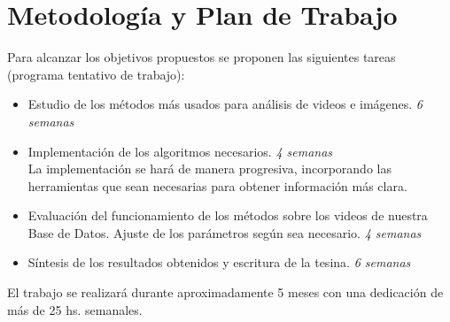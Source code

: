 \section{Metodología y Plan de Trabajo}
\iffalse
Se recomienda estructurar esta sección en función de los objetivos específicos.
* Planteo de la hipotesis a analizar en cada objetivo o seccion del proyecto.
* Actividades propuestas y metodologıa a usar en cada una de ellas.
* Resultados que se esperan obtener o metas a cumplir y como se evaluaran
los resultados.
Trate de evaluar los potenciales problemas y limitaciones de la metodolog ́ıa
y t ́ecnicas propuestas y en lo posible proponer alternativas.
\fi

Para alcanzar los objetivos propuestos se proponen las siguientes tareas (programa tentativo de trabajo):
\begin{itemize}
  \item Estudio de los métodos más usados para análisis de videos e imágenes. \textit{6 semanas}
  \item Implementación de los algoritmos necesarios. \textit{4 semanas}
    \\ La implementación se hará de manera progresiva, incorporando las herramientas que
    sean necesarias para obtener información más clara.
  \item Evaluación del funcionamiento de los métodos sobre los videos de nuestra Base de Datos.
  Ajuste de los parámetros según sea necesario. \textit{4 semanas}
  \item Síntesis de los resultados obtenidos y escritura de la tesina. \textit{6 semanas}
\end{itemize}
El trabajo se realizará durante aproximadamente 5 meses con una dedicación de más de 25 hs. semanales.

